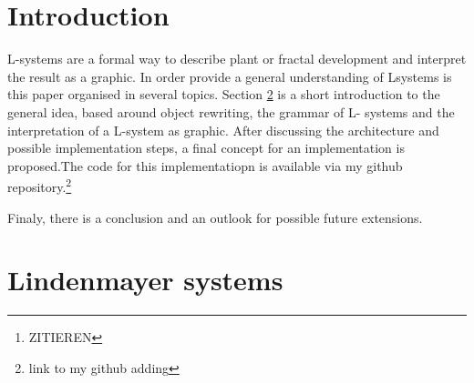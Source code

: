 \documentclass[english]{cpp-hmwk}
\begin{document}

\begin{abstract}
Lindenmayer Systems, short L-systems, are the result of \textbf{research from Lindenmayer et al.}\footnote{ZITIEREN} about the geometric features of plants.
L-systems are a concept to mathematicaly/formal describe and model the growth processes of plant development. They are not only restricted to the plant based developments, but can also be used to generate fractals.

L-systems have an inital state and use rules, like a formal grammar, to transform or rather rewrite the current state to create the next state of the development from a plant or a fractal.
It is therefore possible to successive calculate each state of the development.
Such a state of a L-system can be interpreted as commands for a turtle graphic, which creates the opportunity to draw the created fractals or plant states. 

Goal of this paper is to design an architecture for L-systems, which includes an implementation for L-systems, their creation and an interface for a turtle graphic. The interface should enable the polymorphic use of different turtle graphic implementations and enable drawing of the L-system state.
\end{abstract}

\pagebreak
\section{Introduction}
L-systems are a formal way to describe plant or fractal development and interpret the result as a graphic. In order provide a general understanding of Lsystems is this  paper organised in several topics. Section \ref{section:lindenmayer} is a short introduction to the general idea,  based around object rewriting, the grammar of L- systems and the interpretation of a L-system as graphic.
After discussing the architecture and possible implementation steps, a final concept for an implementation is proposed.The code for this implementatiopn is available via my github repository.\footnote{link to my github adding}

Finaly, there is a conclusion and an outlook for possible future extensions.

\section{Lindenmayer systems}
\label{section:lindenmayer}
\end{document}
